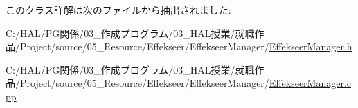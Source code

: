このクラス詳解は次のファイルから抽出されました\+:\begin{DoxyCompactItemize}
\item 
C\+:/\+H\+A\+L/\+P\+G関係/03\+\_\+作成プログラム/03\+\_\+\+H\+A\+L授業/就職作品/\+Project/source/05\+\_\+\+Resource/\+Effekseer/\+Effekseer\+Manager/\mbox{\hyperlink{_effekseer_manager_8h}{Effekseer\+Manager.\+h}}\item 
C\+:/\+H\+A\+L/\+P\+G関係/03\+\_\+作成プログラム/03\+\_\+\+H\+A\+L授業/就職作品/\+Project/source/05\+\_\+\+Resource/\+Effekseer/\+Effekseer\+Manager/\mbox{\hyperlink{_effekseer_manager_8cpp}{Effekseer\+Manager.\+cpp}}\end{DoxyCompactItemize}
